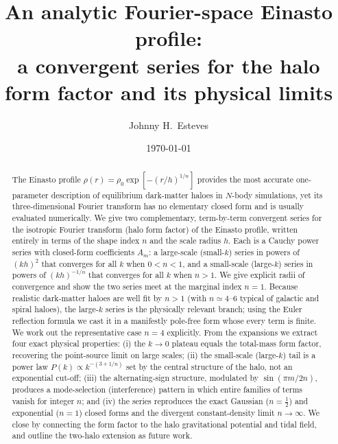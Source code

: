 \documentclass[aps,prd,onecolumn]{revtex4-2}
\begin{document}
\title{An analytic Fourier-space Einasto profile:\\
a convergent series for the halo form factor and its physical limits}

\author{Johnny H.~Esteves}

\date{\today}

\begin{abstract}
The Einasto profile $\rho(r)=\rho_0\exp[-(r/h)^{1/n}]$ provides the most
accurate one-parameter description of equilibrium dark-matter haloes in
$N$-body simulations, yet its three-dimensional Fourier transform has no
elementary closed form and is usually evaluated numerically.  We give two
complementary, term-by-term convergent series for the isotropic Fourier
transform (halo form factor) of the Einasto profile, written entirely in
terms of the shape index $n$ and the scale radius $h$.  Each is a Cauchy
power series with closed-form coefficients $A_m$: a large-scale
(small-$k$) series in powers of $(kh)^{2}$ that converges for all $k$ when
$0<n<1$, and a small-scale (large-$k$) series in powers of $(kh)^{-1/n}$
that converges for all $k$ when $n>1$.  We give explicit radii of
convergence and show the two series meet at the marginal index $n=1$.
Because realistic dark-matter haloes are well fit by $n>1$ (with
$n\simeq4$--$6$ typical of galactic and spiral haloes), the large-$k$
series is the physically relevant branch; using the Euler reflection
formula we cast it in a manifestly pole-free form whose every term is
finite.  We work out the representative case $n=4$ explicitly.  From the
expansions we extract four exact physical properties: (i) the $k\to0$
plateau equals the total-mass form factor, recovering the point-source
limit on large scales; (ii) the small-scale (large-$k$) tail is a power
law $P(k)\propto k^{-(3+1/n)}$ set by the central structure of the halo,
not an exponential cut-off; (iii) the alternating-sign structure,
modulated by $\sin(\pi m/2n)$, produces a mode-selection (interference)
pattern in which entire families of terms vanish for integer $n$; and
(iv) the series reproduces the exact Gaussian ($n=\tfrac12$) and
exponential ($n=1$) closed forms and the divergent constant-density limit
$n\to\infty$.  We close by connecting the form factor to the halo
gravitational potential and tidal field, and outline the two-halo
extension as future work.
\end{abstract}

\maketitle
\end{document}
